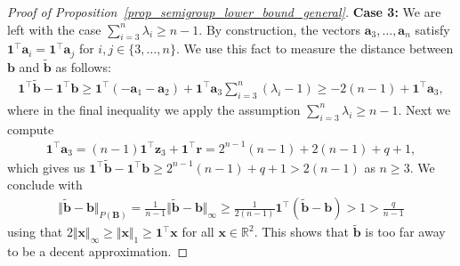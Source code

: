 \documentclass[10pt,a4paper]{amsart}
\newcommand{\R}{\mathbb{R}}
\newcommand{\bB}{\bm{B}}
\newcommand{\ba}{\bm{a}}
\newcommand{\bb}{\bm{b}}
\newcommand{\br}{\bm{r}}
\newcommand{\bx}{\bm{x}}
\newcommand{\bz}{\bm{z}}
\begin{document}
\begin{proof}[Proof of Proposition~\ref{prop_semigroup_lower_bound_general}]
		\textbf{Case 3:} We are left with the case $\sum_{i=3}^n\lambda_i \geq n-1$. By construction, the vectors $\ba_3,\ldots,\ba_n$ satisfy $\bm{1}^\top\ba_i = \bm{1}^\top \ba_j$ for $i,j\in\lbrace 3,\ldots,n\rbrace$. We use this fact to measure the distance between $\bb$ and $\tilde{\bb}$ as follows:
		\begin{align*}
			\bm{1}^\top\tilde{\bb} - \bm{1}^\top\bb \geq \bm{1}^\top (-\ba_1-\ba_2) + \bm{1}^\top\ba_3 \sum_{i=3}^n (\lambda_i - 1)\geq -2(n-1) + \bm{1}^\top\ba_3,
		\end{align*}
		where in the final inequality we apply the assumption $\sum_{i=3}^{n}\lambda_i\geq n-1$. Next we compute
		\begin{align*}
			\bm{1}^\top\ba_3 = (n-1)\bm{1}^\top\bz_3 + \bm{1}^\top\br =  2^{n-1}(n-1) + 2(n-1) + q + 1,
		\end{align*}
		which gives us $\bm{1}^\top\tilde{\bb} - \bm{1}^\top\bb\geq 2^{n-1}(n-1) + q + 1 > 2(n-1)$ as $n\geq 3$. We conclude with
		\begin{align*}
			\Vert \tilde{\bb} - \bb\Vert_{P(\bB)} = \frac{1}{n-1}\Vert \tilde{\bb} - \bb\Vert_\infty \geq \frac{1}{2(n-1)} \bm{1}^\top(\tilde{\bb} - \bb) > 1 > \frac{q}{n-1}
		\end{align*}
		using that $2\Vert \bx\Vert_\infty\geq\Vert\bx\Vert_1\geq \bm{1}^\top\bx$ for all $\bx\in\R^2$. 
		This shows that $\tilde{\bb}$ is too far away to be a decent approximation.
	\end{proof}	
\end{document}
